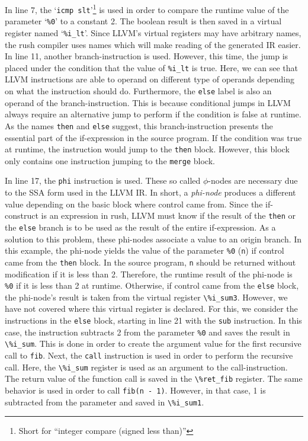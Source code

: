 In line 7, the `\texttt{icmp slt}'\footnote{Short for \enquote{integer compare (signed less than)}} is used in order to compare the runtime value of the parameter `\texttt{\%0}' to a constant 2.
The boolean result is then saved in a virtual register named `\texttt{\%i\_lt}'.
Since LLVM's virtual registers may have arbitrary names,
the rush compiler uses names which will make reading of the generated IR easier.
In line 11, another branch-instruction is used.
However, this time, the jump is placed under the condition that the value of \texttt{\%i\_lt} is true.
Here, we can see that LLVM instructions are able to operand on different type of operands depending on what the instruction should do.
Furthermore, the \texttt{else} label is also an operand of the branch-instruction.
This is because conditional jumps in LLVM always require an alternative jump to perform if the condition is false at runtime.
As the names \texttt{then} and \texttt{else} suggest, this branch-instruction presents the essential part of the if-expression in the source program.
If the condition was true at runtime, the instruction would jump to the \texttt{then} block.
However, this block only contains one instruction jumping to the \texttt{merge} block.

In line 17, the \texttt{phi} instruction is used.
These so called $\phi$-nodes are necessary due to the SSA form used in the LLVM IR\@.
In short, a \emph{phi-node} produces a different value depending on the basic block where control came from.
Since the if-construct is an expression in rush, LLVM must know if the result of the \texttt{then} or the \texttt{else} branch is to be used as the result of the entire if-expression.
As a solution to this problem, these phi-nodes associate a value to an origin branch.
In this example, the phi-node yields the value of the parameter \texttt{\%0} (\texttt{n}) if control came from the \texttt{then} block.
In the source program, \texttt{n} should be returned without modification if it is less than 2.
Therefore, the runtime result of the phi-node is \texttt{\%0} if it is less than 2 at runtime.
Otherwise, if control came from the \texttt{else} block, the phi-node's result is taken from the virtual register \Verb|\%i_sum3|.
However, we have not covered where this virtual register is declared.
For this, we consider the instructions in the \texttt{else} block, starting in line 21 with the \texttt{sub} instruction.
In this case, the instruction subtracts 2 from the parameter \texttt{\%0} and saves the result in \Verb|\%i_sum|.
This is done in order to create the argument value for the first recursive call to \texttt{fib}.
Next, the \texttt{call} instruction is used in order to perform the recursive call.
Here, the \Verb|\%i_sum| register is used as an argument to the call-instruction.
The return value of the function call is saved in the \Verb|\%ret_fib| register.
The same behavior is used in order to call \texttt{fib(n - 1)}.
However, in that case, 1 is subtracted from the parameter and saved in \Verb|\%i_sum1|.

